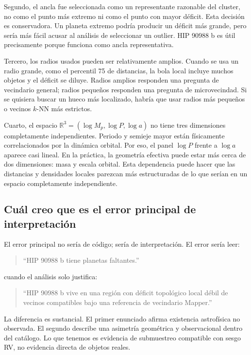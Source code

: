 \documentclass[11pt]{article}
\begin{document}
Segundo, el ancla fue seleccionada como un representante razonable del cluster, no como el punto más extremo ni como el punto con mayor déficit. Esta decisión es conservadora. Un planeta extremo podría producir un déficit más grande, pero sería más fácil acusar al análisis de seleccionar un outlier. HIP 90988 b es útil precisamente porque funciona como ancla representativa.

Tercero, los radios usados pueden ser relativamente amplios. Cuando se usa un radio grande, como el percentil 75 de distancias, la bola local incluye muchos objetos y el déficit se diluye. Radios amplios responden una pregunta de vecindario general; radios pequeños responden una pregunta de microvecindad. Si se quisiera buscar un hueco más localizado, habría que usar radios más pequeños o vecinos $k$-NN más estrictos.

Cuarto, el espacio $\mathbb{R}^3=(\log M_p,\log P,\log a)$ no tiene tres dimensiones completamente independientes. Periodo y semieje mayor están físicamente correlacionados por la dinámica orbital. Por eso, el panel $\log P$ frente a $\log a$ aparece casi lineal. En la práctica, la geometría efectiva puede estar más cerca de dos dimensiones: masa y escala orbital. Esta dependencia puede hacer que las distancias y densidades locales parezcan más estructuradas de lo que serían en un espacio completamente independiente.

\subsection{Cuál creo que es el error principal de interpretación}

El error principal no sería de código; sería de interpretación. El error sería leer:

\begin{quote}
``HIP 90988 b tiene planetas faltantes.''
\end{quote}

cuando el análisis solo justifica:

\begin{quote}
``HIP 90988 b vive en una región con déficit topológico local débil de vecinos compatibles bajo una referencia de vecindario Mapper.''
\end{quote}

La diferencia es sustancial. El primer enunciado afirma existencia astrofísica no observada. El segundo describe una asimetría geométrica y observacional dentro del catálogo. Lo que tenemos es evidencia de submuestreo compatible con sesgo RV, no evidencia directa de objetos reales.
\end{document}
